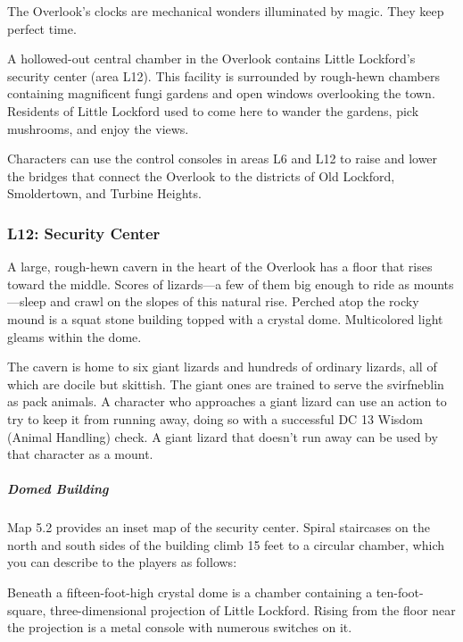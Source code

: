 \documentclass[10pt,a4paper,twoside,bg=print,twocolumn,openany,nodeprecatedcode]{dndbook}
\begin{document}
The Overlook's clocks are mechanical wonders illuminated by magic. They keep perfect time.

A hollowed-out central chamber in the Overlook contains Little Lockford's security center (area L12). This facility is surrounded by rough-hewn chambers containing magnificent fungi gardens and open windows overlooking the town. Residents of Little Lockford used to come here to wander the gardens, pick mushrooms, and enjoy the views.

Characters can use the control consoles in areas L6 and L12 to raise and lower the bridges that connect the Overlook to the districts of Old Lockford, Smoldertown, and Turbine Heights.

\subsubsection{L12: Security Center}
\begin{DndReadAloud}{}
A large, rough-hewn cavern in the heart of the Overlook has a floor that rises toward the middle. Scores of lizards—a few of them big enough to ride as mounts—sleep and crawl on the slopes of this natural rise. Perched atop the rocky mound is a squat stone building topped with a crystal dome. Multicolored light gleams within the dome.

\end{DndReadAloud}

The cavern is home to six giant lizards and hundreds of ordinary lizards, all of which are docile but skittish. The giant ones are trained to serve the svirfneblin as pack animals. A character who approaches a giant lizard can use an action to try to keep it from running away, doing so with a successful DC 13 Wisdom (Animal Handling) check. A giant lizard that doesn't run away can be used by that character as a mount.

\subparagraph{Domed Building}
Map 5.2 provides an inset map of the security center. Spiral staircases on the north and south sides of the building climb 15 feet to a circular chamber, which you can describe to the players as follows:

\begin{DndReadAloud}{}
Beneath a fifteen-foot-high crystal dome is a chamber containing a ten-foot-square, three-dimensional projection of Little Lockford. Rising from the floor near the projection is a metal console with numerous switches on it.

\end{DndReadAloud}
\end{document}
